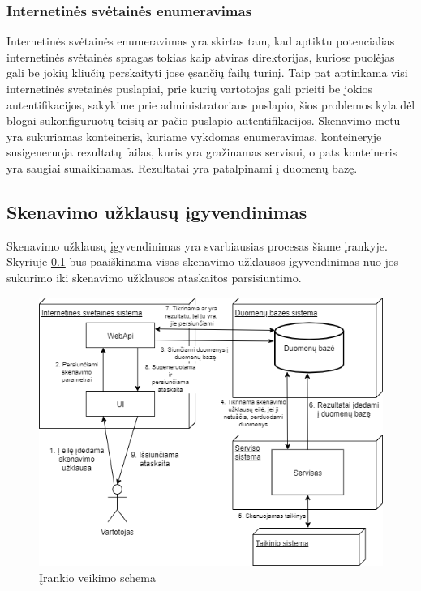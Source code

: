 \documentclass[a4paper,12pt,fleqn]{article}
\begin{document}
\subsubsection{Internetinės svėtainės enumeravimas}
\label{sec:scanEnum}
Internetinės svėtainės enumeravimas yra skirtas tam, kad aptiktu potencialias internetinės svėtainės spragas tokias kaip atviras direktorijas, kuriose puolėjas gali be jokių kliučių perskaityti jose ęsančių failų turinį. Taip pat aptinkama visi internetinės svetainės puslapiai, prie kurių vartotojas gali prieiti be jokios autentifikacijos, sakykime prie administratoriaus puslapio, šios problemos kyla dėl blogai sukonfiguruotų teisių ar pačio puslapio autentifikacijos. Skenavimo metu yra sukuriamas konteineris, kuriame vykdomas enumeravimas, konteineryje susigeneruoja rezultatų failas, kuris yra gražinamas servisui, o pats konteineris yra saugiai sunaikinamas. Rezultatai yra patalpinami į duomenų bazę.

\subsection{Skenavimo užklausų įgyvendinimas}
\label{sec:allProc}

Skenavimo užklausų įgyvendinimas yra svarbiausias procesas šiame įrankyje. Skyriuje \ref{sec:allProc} bus paaiškinama visas skenavimo užklausos įgyvendinimas nuo jos sukurimo iki skenavimo užklausos ataskaitos parsisiuntimo.

\begin{figure}[H]
	\centering
	\includegraphics[width=1\textwidth]{figs/Fulllt.png}
	\caption{Įrankio veikimo schema}
	\label{fig:full}
\end{figure}
\end{document}
